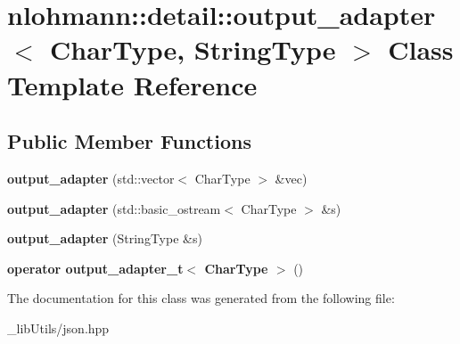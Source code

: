 \hypertarget{classnlohmann_1_1detail_1_1output__adapter}{}\section{nlohmann\+:\+:detail\+:\+:output\+\_\+adapter$<$ Char\+Type, String\+Type $>$ Class Template Reference}
\label{classnlohmann_1_1detail_1_1output__adapter}
\subsection*{Public Member Functions}
\begin{DoxyCompactItemize}
\item 
{\bfseries output\+\_\+adapter} (std\+::vector$<$ Char\+Type $>$ \&vec)\hypertarget{classnlohmann_1_1detail_1_1output__adapter_a05a30a77b568fd84676078d938cbd484}{}\label{classnlohmann_1_1detail_1_1output__adapter_a05a30a77b568fd84676078d938cbd484}

\item 
{\bfseries output\+\_\+adapter} (std\+::basic\+\_\+ostream$<$ Char\+Type $>$ \&s)\hypertarget{classnlohmann_1_1detail_1_1output__adapter_a43b3ba852e6a2c3f4d312543bb04c00d}{}\label{classnlohmann_1_1detail_1_1output__adapter_a43b3ba852e6a2c3f4d312543bb04c00d}

\item 
{\bfseries output\+\_\+adapter} (String\+Type \&s)\hypertarget{classnlohmann_1_1detail_1_1output__adapter_a6ad59d1ec534383b430cd7ef8a518539}{}\label{classnlohmann_1_1detail_1_1output__adapter_a6ad59d1ec534383b430cd7ef8a518539}

\item 
{\bfseries operator output\+\_\+adapter\+\_\+t$<$ Char\+Type $>$} ()\hypertarget{classnlohmann_1_1detail_1_1output__adapter_a5fdac7aec8ade2f4bb0b5df30550d90c}{}\label{classnlohmann_1_1detail_1_1output__adapter_a5fdac7aec8ade2f4bb0b5df30550d90c}

\end{DoxyCompactItemize}


The documentation for this class was generated from the following file\+:\begin{DoxyCompactItemize}
\item 
\+\_\+lib\+Utils/json.\+hpp\end{DoxyCompactItemize}
